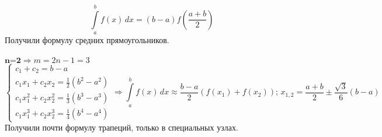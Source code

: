\[
\int\limits_{a}^{b} f(x)\,dx = (b-a)f(\frac{a+b}{2})
\]
Получили формулу средних прямоугольников.\\
\\
$\textbf{n=2}\Rightarrow m = 2n- 1= 3$\\
\[
\begin{cases}
c_1 + c_2 = b - a\\
c_1x_1 + c_2x_2 = \frac{1}{2}(b^2-a^2)\\
c_1x^2_1 + c_2x^2_2 = \frac{1}{3}(b^3-a^3)\\
c_1x^3_1 + c_2x^3_2 = \frac{1}{4}(b^4-a^4)
\end{cases} \Rightarrow
\int\limits_{a}^{b} f(x)\,dx \approx \frac{b-a}{2}(f(x_1)+f(x_2));\,x_{1,2} = \frac{a+b}{2} \pm \frac{\sqrt{3}}{6}(b-a)
\]
Получили почти формулу трапеций, только в специальных узлах.\\

